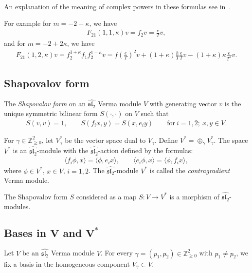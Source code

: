 \documentclass[11pt]{article}
\numberwithin{equation}{section}
\begin{document}
An explanation of the meaning of complex powers in these formulas see in~\cite{MFF}.

For example for $m=-2+\kappa$, we have
\begin{gather*}
F_{21}(1,1,\kappa)v=f_2v=\frac{e}{T}v,
\end{gather*}
and for $m=-2+2\kappa$, we have
\begin{gather*}
F_{21}(1,2,\kappa)v=f_2^{1+\kappa} f_1f_2^{1-\kappa}v=f\left(\frac{e}{T}\right)^2 v+(1+\kappa)\frac{h}{T} \frac{e}{T}v-(1+\kappa)\kappa\frac{e}{T^2}v.
\end{gather*}

\subsection{Shapovalov form}\label{contra}
The {\em Shapovalov form} on an $\widehat{{\mathfrak{sl}_2}}$ Verma module $V$ with generating vector $v$ is the unique symmetric bilinear form $S(\cdot,\cdot)$ on $V$ such that
\begin{gather*}
S(v,v)=1,\qquad S(f_ix,y)=S(x,e_iy) \qquad \text{for} \ i=1,2;\ x,y\in V.
\end{gather*}

For $\gamma\in{\mathbb Z}^2_{\geq 0}$, let $V^*_{\gamma}$ be the vector space dual to $V_{\gamma}$. Define $V^*=\oplus_\gamma V_{\gamma}^*$. The space $V^*$ is an $\widehat{{\mathfrak{sl}_2}}$-module with the $\widehat{{\mathfrak{sl}_2}}$-action defined by the formulas:
\begin{gather*}
\langle f_i\phi,x\rangle=\langle \phi,e_ix\rangle, \qquad \langle e_i\phi,x\rangle=\langle\phi,f_ix\rangle ,
\end{gather*}
where $\phi\in V^*$, $x\in V$, $i=1,2 $. The $\widehat{{\mathfrak{sl}_2}}$-module $V^*$ is called the {\em contragradient} Verma module.

The Shapovalov form $S$ considered as a map $S\colon V\longrightarrow V^*$ is a morphism of $\widehat{{\mathfrak{sl}_2}}$-modules.

\subsection[Bases in $V$ and $V^*$]{Bases in $\boldsymbol{V}$ and $\boldsymbol{V^*}$}\label{BASIS}
Let $V$ be an $\widehat{{\mathfrak{sl}_2}}$ Verma module $V$. For every $\gamma=(p_1,p_2)\in{\mathbb Z}^2_{\geq 0}$ with $p_1\ne p_2$, we fix a basis in the homogeneous component $V_{\gamma}\subset V$.
\end{document}
